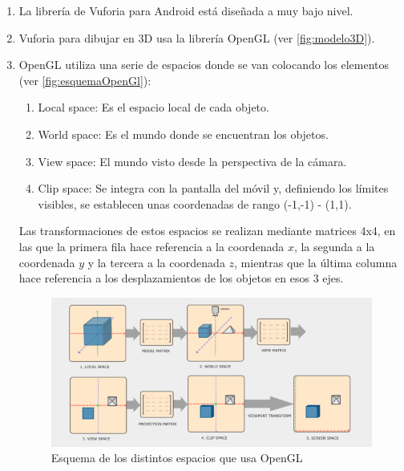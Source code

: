 \begin{enumerate}
    \item La librería de Vuforia para Android está diseñada a muy bajo nivel.
    \item Vuforia para dibujar en 3D usa la librería OpenGL (ver \autoref{fig:modelo3D}).
    \item OpenGL utiliza una serie de espacios donde se van colocando los elementos (ver \autoref{fig:esquemaOpenGl}): 
    \begin{enumerate}
        \item Local space: Es el espacio local de cada objeto.
        \item World space: Es el mundo donde se encuentran los objetos.
        \item View space: El mundo visto desde la perspectiva de la cámara.
        \item Clip space: Se integra con la pantalla del móvil y, definiendo los límites visibles, se establecen unas coordenadas de rango (-1,-1) - (1,1).
    \end{enumerate}
    
        Las transformaciones de estos espacios se realizan mediante matrices 4x4, 
        en las que la primera fila hace referencia a la coordenada $x$, la segunda a la coordenada $y$ y la 
        tercera a la coordenada $z$, mientras que la última columna hace referencia a los desplazamientos 
        de los objetos en esos 3 ejes.
            \begin{figure}[H]
                \centering
                \includegraphics[width=5in]{figures/space-transformation.png}
                \caption{Esquema de los distintos espacios que usa OpenGL\cite{spaceopengl}}
                \label{fig:esquemaOpenGl}
            \end{figure}



\end{enumerate}
